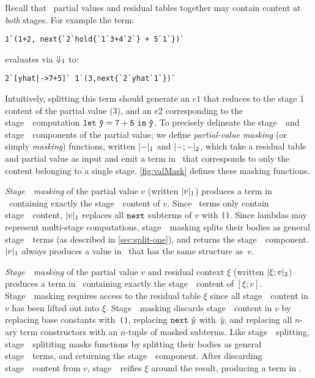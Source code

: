 
Recall that \lang\ partial values and residual tables together may
contain content at \emph{both} stages. For example the term:
\begin{lstlisting}
1`(1+2, next{`2`hold{`1`3+4`2`} + 5`1`})`
\end{lstlisting}
evaluates via ${\Downarrow_{ 1}}$ to:
\begin{lstlisting}
2`[yhat|->7+5]` 1`(3,next{`2`yhat`1`})`
\end{lstlisting}
Intuitively, splitting this term should generate an $e1$ that reduces to the stage 1 content of the partial value (3), and an $e2$ corresponding to the stage~\bbtwo\
computation ${\tt let}~{\mathtt{\hat y}} = {\mathtt{7+5}}~{\tt in}~{\mathtt{\hat y}}$.
To precisely delineate the stage~\bbone\ and stage~\bbtwo\ components of the partial value, we define 
\emph{partial-value masking} (or simply {\em masking}) functions, written $|{-}|_{ 1}$ and $|{-};{-}|_{ 2}$, 
which take a residual table and partial value as input and emit a term in \langmono\ that corresponds to only the content belonging to a single stage. \ref{fig:valMask} defines these
masking functions.

\emph{Stage~\bbone\ masking} of the partial value $v$ (written $|v|_{ 1}$) produces a term in \langmono\ containing exactly
the stage~\bbone\ content of $v$. Since \next\ terms only contain stage~\bbtwo\
content, $|v|_{ 1}$ replaces all ${\tt next}$ subterms of $v$ with \texttt{()}.  Since lambdas may represent multi-stage computations, stage~\bbone\ masking splits their bodies as general stage~\bbone\ terms (as described in \ref{sec:split-one}), and returns
the stage~\bbone\ component. $|v|_{ 1}$ always produces a value in \langmono\ that has
the same structure as~$v$.

\emph{Stage~\bbtwo\ masking} of the partial value $v$ and residual context $\xi$ (written $|\xi;v|_{ 2}$) produces a term in \langmono\ containing
exactly the stage~\bbtwo\ content of $[\xi;v]$. Stage~\bbtwo\ masking 
requires access to the residual table $\xi$ since all stage~\bbtwo\
content in $v$ has been lifted out into $\xi$. Stage~\bbtwo\ masking discards
stage~\bbone\ content in $v$ by replacing base constants with~\texttt{()},
replacing ${\tt next}~\hat{y}$ with~$\hat{y}$, and replacing all $n$-ary term
constructors with an $n$-tuple of masked subterms. Like stage~\bbone\ splitting, stage~\bbtwo\
splititing masks functions by splitting their bodies as general stage~\bbone\ terms, and
returning the stage~\bbtwo\ component. After discarding stage~\bbone\ content from $v$, stage~\bbtwo\ reifies $\xi$ around the result,
producing a term in \langmono. 

